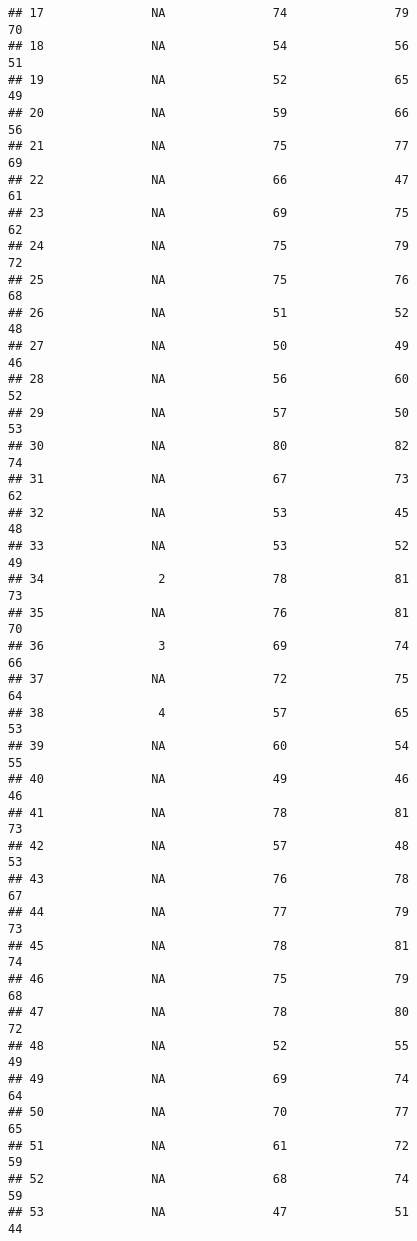 \documentclass[]{article}
\begin{document}
\begin{verbatim}
## 17               NA               74               79             70
## 18               NA               54               56             51
## 19               NA               52               65             49
## 20               NA               59               66             56
## 21               NA               75               77             69
## 22               NA               66               47             61
## 23               NA               69               75             62
## 24               NA               75               79             72
## 25               NA               75               76             68
## 26               NA               51               52             48
## 27               NA               50               49             46
## 28               NA               56               60             52
## 29               NA               57               50             53
## 30               NA               80               82             74
## 31               NA               67               73             62
## 32               NA               53               45             48
## 33               NA               53               52             49
## 34                2               78               81             73
## 35               NA               76               81             70
## 36                3               69               74             66
## 37               NA               72               75             64
## 38                4               57               65             53
## 39               NA               60               54             55
## 40               NA               49               46             46
## 41               NA               78               81             73
## 42               NA               57               48             53
## 43               NA               76               78             67
## 44               NA               77               79             73
## 45               NA               78               81             74
## 46               NA               75               79             68
## 47               NA               78               80             72
## 48               NA               52               55             49
## 49               NA               69               74             64
## 50               NA               70               77             65
## 51               NA               61               72             59
## 52               NA               68               74             59
## 53               NA               47               51             44

\end{verbatim}
\end{document}
